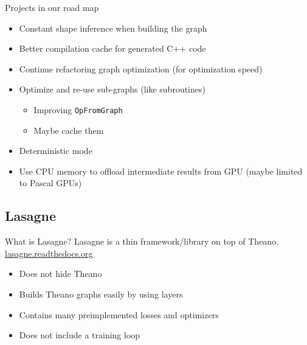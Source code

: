 \documentclass[a4paper,9pt]{beamer}
\begin{document}
\begin{frame}[fragile]{Projects in our road map}
  \begin{itemize}
    \item Constant shape inference when building the graph
    \item Better compilation cache for generated C++ code
    \item Continue refactoring graph optimization (for optimization speed)
    \item Optimize and re-use sub-graphs (like subroutines)
      \begin{itemize}
        \item Improving \verb|OpFromGraph|
        \item Maybe cache them
      \end{itemize}
    \item Deterministic mode
    \item Use CPU memory to offload intermediate results from GPU (maybe limited to Pascal GPUs)
  \end{itemize}
\end{frame}

\subsection{Lasagne}

\begin{frame}{What is Lasagne?}
  Lasagne is a thin framework/library on top of Theano.
  \url{lasagne.readthedocs.org}
  \begin{itemize}
    \item Does not hide Theano
    \item Builds Theano graphs easily by using layers
    \item Contains many preimplemented losses and optimizers
    \item Does not include a training loop
  \end{itemize}
\end{frame}


\section{}
\end{document}
